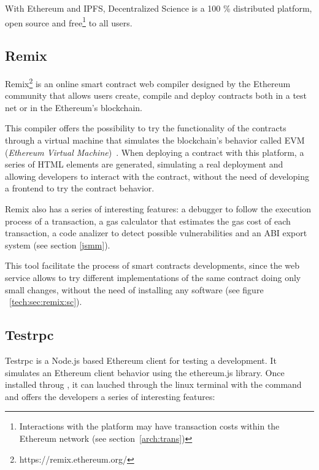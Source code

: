 With Ethereum and IPFS, Decentralized Science is a 100 \% distributed platform,
open source and free\footnote{Interactions with the platform may have
  transaction costs within the Ethereum network (see section~\ref{arch:trans})
  \nopagebreak} to all users.


\subsection{Remix}
\label{sec:remix}

Remix\footnote{https://remix.ethereum.org/} is an online smart
contract web compiler designed by the Ethereum community that allows users
create, compile and deploy contracts both in a test net or in the Ethereum's
blockchain.

This compiler offers the possibility to try the functionality of the contracts
through a virtual machine that simulates the blockchain's behavior called EVM
(\emph{Ethereum Virtual Machine})~\cite{hildenbrandt2017kevm}. When deploying a
contract with this platform, a series of HTML elements are generated, simulating
a real deployment and allowing developers to interact with the contract, without
the need of developing a frontend to try the contract behavior.

Remix also has a series of interesting features: a debugger to follow the
execution process of a transaction, a gas calculator that estimates the gas cost
of each transaction, a code analizer to detect possible vulnerabilities and an
ABI export system (see section \ref{jsmm}).

This tool facilitate the process of smart contracts developments, since the web
service allows to try different implementations of the same contract doing only
small changes, without the need of installing any software (see figure
~\ref{tech:sec:remix:sc}).

\subsection{Testrpc}
\label{testrpc}


Testrpc is a Node.js based Ethereum client for testing a development. It
simulates an Ethereum client behavior using the ethereum.js library. Once
installed throug , it can lauched through the linux terminal with the
command  and offers the developers a series of interesting
features:

